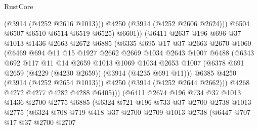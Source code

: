 \begin{lexlean}{RustCore}
\begin{coremodule}
                          (@3914 (@4252 @2616 @1013)))
                        @4250
                        (@3914 (@4252 @2606 @2624)))
                      @6504
                      @6507
                      @6510
                      @6514
                      @6519
                      @6525)
                    @6601))
                (@6411
                  @2637
                  @196
                  @696
                  @37
                  @1013
                  @1436
                  @2663
                  @2672
                  @6885
                  (@6335
                    @695
                    @17
                    @37
                    @2663
                    @2670
                    @1060
                    (@6469
                      @694
                      @11
                      @15
                      @1927
                      @2662
                      @2669
                      @1034
                      @2643
                      @1007
                      @6488
                      (@6343
                        @692
                        @117
                        @11
                        @14
                        @2659
                        @1013
                        @1069
                        @1034
                        @2653
                        @1007
                        (@6378 @691 @2659 (@4229 (@4230 @2659)) (@3914 (@4235 @691 @11)))
                        @6385
                        @4250
                        (@3914 (@4252 @2654 @1013)))
                      @4250
                      (@3914 (@4252 @2644 @2662)))
                    @4268
                    @4272
                    @4277
                    @4282
                    @4288
                    @6405)))
              (@6411
                @2674
                @196
                @734
                @37
                @1013
                @1436
                @2700
                @2775
                @6885
                (@6324
                  @721
                  @196
                  @733
                  @37
                  @2700
                  @2738
                  @1013
                  @2775
                  (@6324
                    @708
                    @719
                    @418
                    @37
                    @2700
                    @2709
                    @1013
                    @2738
                    (@6447
                      @707
                      @17
                      @37
                      @2700
                      @2707

\end{coremodule}
\end{lexlean}
